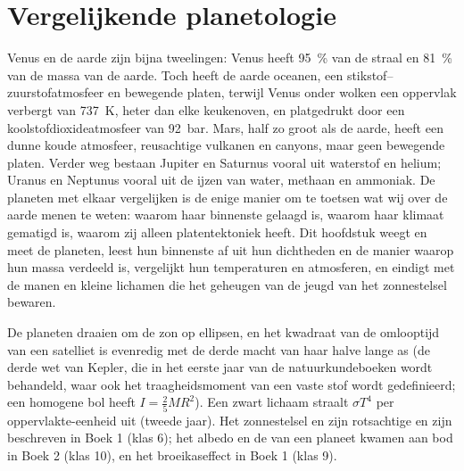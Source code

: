 \chapter{Vergelijkende planetologie}\label{ch:b1:comparative-planetology}

Venus en de aarde zijn bijna tweelingen: Venus heeft \qty{95}{\percent} van de straal
en \qty{81}{\percent} van de massa van de aarde. Toch heeft de aarde oceanen, een
stikstof--zuurstofatmosfeer en bewegende platen, terwijl Venus onder wolken een
oppervlak verbergt van \qty{737}{K}, heter dan elke keukenoven, en platgedrukt door
een koolstofdioxideatmosfeer van \qty{92}{bar}. Mars, half zo groot als de aarde,
heeft een dunne koude atmosfeer, reusachtige vulkanen en canyons, maar geen bewegende
platen. Verder weg bestaan Jupiter en Saturnus vooral uit waterstof en helium; Uranus en
Neptunus vooral uit de ijzen van water, methaan en ammoniak. De planeten met elkaar
vergelijken is de enige manier om te toetsen wat wij over de aarde menen te weten:
waarom haar binnenste gelaagd is, waarom haar klimaat gematigd is, waarom zij alleen
platentektoniek heeft. Dit hoofdstuk weegt en meet de planeten, leest hun binnenste af uit
hun dichtheden en de manier waarop hun massa verdeeld is, vergelijkt hun temperaturen en
atmosferen, en eindigt met de manen en kleine lichamen die het geheugen van de jeugd van het
zonnestelsel bewaren.

\begin{recall}
De planeten draaien om de zon op ellipsen, en het kwadraat van de omlooptijd van een
satelliet is evenredig met de derde macht van haar halve lange as (de derde wet van Kepler,
die in het eerste jaar van de natuurkundeboeken wordt behandeld, waar ook het traagheidsmoment
van een vaste stof wordt gedefinieerd; een homogene bol heeft $I = \tfrac25MR^2$). Een
zwart lichaam straalt $\sigma T^4$ per oppervlakte-eenheid uit (tweede jaar). Het zonnestelsel
en zijn rotsachtige en  zijn beschreven in Boek 1 (klas 6); het albedo en de
 van een planeet kwamen aan bod in Boek 2 (klas 10), en het broeikaseffect
in Boek 1 (klas 9).
\end{recall}

